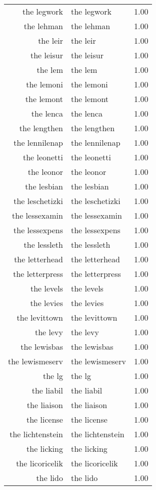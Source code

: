 \begin{table}[ht]
\begin{tabular}{rlr}
  the legwork & the legwork & 1.00 \\ 
  the lehman & the lehman & 1.00 \\ 
  the leir & the leir & 1.00 \\ 
  the leisur & the leisur & 1.00 \\ 
  the lem & the lem & 1.00 \\ 
  the lemoni & the lemoni & 1.00 \\ 
  the lemont & the lemont & 1.00 \\ 
  the lenca & the lenca & 1.00 \\ 
  the lengthen & the lengthen & 1.00 \\ 
  the lennilenap & the lennilenap & 1.00 \\ 
  the leonetti & the leonetti & 1.00 \\ 
  the leonor & the leonor & 1.00 \\ 
  the lesbian & the lesbian & 1.00 \\ 
  the leschetizki & the leschetizki & 1.00 \\ 
  the lessexamin & the lessexamin & 1.00 \\ 
  the lessexpens & the lessexpens & 1.00 \\ 
  the lessleth & the lessleth & 1.00 \\ 
  the letterhead & the letterhead & 1.00 \\ 
  the letterpress & the letterpress & 1.00 \\ 
  the levels & the levels & 1.00 \\ 
  the levies & the levies & 1.00 \\ 
  the levittown & the levittown & 1.00 \\ 
  the levy & the levy & 1.00 \\ 
  the lewisbas & the lewisbas & 1.00 \\ 
  the lewismeserv & the lewismeserv & 1.00 \\ 
  the lg & the lg & 1.00 \\ 
  the liabil & the liabil & 1.00 \\ 
  the liaison & the liaison & 1.00 \\ 
  the license & the license & 1.00 \\ 
  the lichtenstein & the lichtenstein & 1.00 \\ 
  the licking & the licking & 1.00 \\ 
  the licoricelik & the licoricelik & 1.00 \\ 
  the lido & the lido & 1.00 \\ 

\end{tabular}
\end{table}
